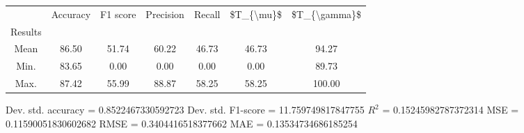 \begin{tabular}{|c|c|c|c|c|c|c|}
\toprule
{} &  Accuracy &  F1 score &  Precision &  Recall &  \$T\_\{\textbackslash mu\}\$ &  \$T\_\{\textbackslash gamma\}\$ \\
Results &           &           &            &         &            &               \\
\hline
Mean    &     86.50 &     51.74 &      60.22 &   46.73 &      46.73 &         94.27 \\
Min.    &     83.65 &      0.00 &       0.00 &    0.00 &       0.00 &         89.73 \\
Max.    &     87.42 &     55.99 &      88.87 &   58.25 &      58.25 &        100.00 \\
\bottomrule
\end{tabular}

 Dev. std. accuracy = 0.8522467330592723
 Dev. std. F1-score = 11.759749817847755
 $R^2$ = 0.15245982787372314
 MSE = 0.11590051830602682
 RMSE = 0.3404416518377662
 MAE = 0.13534734686185254